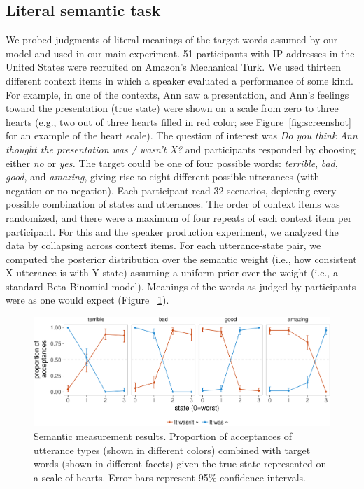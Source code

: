 \documentclass[9pt,twocolumn,twoside,lineno]{main_class_file}
\begin{document}
{\subsection*{Literal semantic task}\label{literal-semantic-task}

We probed judgments of literal meanings of the target words assumed by
our model and used in our main experiment. 51 participants with IP
addresses in the United States were recruited on Amazon's Mechanical
Turk. We used thirteen different context items in which a speaker
evaluated a performance of some kind. For example, in one of the
contexts, Ann saw a presentation, and Ann's feelings toward the
presentation (true state) were shown on a scale from zero to three
hearts (e.g., two out of three hearts filled in red color; see
Figure~\ref{fig:screenshot} for an example of the heart scale). The
question of interest was \emph{Do you think Ann thought the
presentation was / wasn't X?} and participants responded by choosing
either \emph{no} or \emph{yes.} The target could be one of four
possible words: \emph{terrible}, \emph{bad}, \emph{good}, and
\emph{amazing}, giving rise to eight different possible utterances (with
negation or no negation). Each participant read 32 scenarios, depicting
every possible combination of states and utterances. The order of
context items was randomized, and there were a maximum of four repeats
of each context item per participant. For this and the speaker
production experiment, we analyzed the data by collapsing across context
items. For each utterance-state pair, we computed the posterior
distribution over the semantic weight (i.e., how consistent X utterance
is with Y state) assuming a uniform prior over the weight (i.e., a
standard Beta-Binomial model). Meanings of the words as judged by
participants were as one would expect (Figure ~\ref{fig:litsem}).

\begin{figure}[!h]
\includegraphics[width=0.9\columnwidth]{fig/litsem-1}
\centering \caption{Semantic measurement results. Proportion of acceptances of utterance types (shown in different colors) combined with target words (shown in different facets) given the true state represented on a scale of hearts. Error bars represent 95\% confidence intervals.}\label{fig:litsem}
\end{figure}

}
\end{document}
